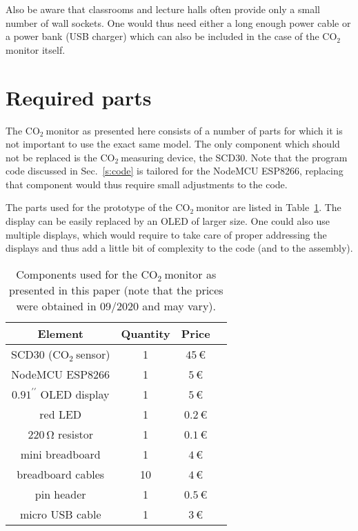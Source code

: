 \documentclass[12pt,a4paper]{article}
\newcommand{\inchsign}{^{\prime\prime}}
\newcommand{\coo}{\ensuremath{\mathrm{CO_2}~}}
\begin{document}
Also be aware that classrooms and lecture halls often provide only a small number of wall sockets. One would thus need either a long enough power cable or a power bank (USB charger) which can also be included in the case of the \coo monitor itself.


\section{Required parts}
The \coo monitor as presented here consists of a number of parts for which it is not important to use the exact same model. The only component which should not be replaced is the \coo measuring device, the SCD30. Note that the program code discussed in Sec.~\ref{s:code} is tailored for the NodeMCU ESP8266, replacing that component would thus require small adjustments to the code. 

The parts used for the prototype of the \coo monitor are listed in Table~\ref{t:parts}. The display can be easily replaced by an OLED of larger size. One could also use multiple displays, which would require to take care of proper addressing the displays and thus add a little bit of complexity to the code (and to the assembly). 
\begin{table}\label{t:parts}
\center
\begin{tabular}{cccc}\toprule
Element & Quantity & Price \\\hline
SCD30 (\coo sensor) & 1 & $45\,$\euro \\
NodeMCU ESP8266 & 1 & $5\,$\euro \\
$0.91\inchsign$ OLED display	& 1	& $5\,$\euro \\
red LED					& 1 	& $0.2\,$\euro \\
$220\,\mathrm{\Omega}$ resistor	& 1	& $0.1\,$\euro \\
mini breadboard		& 1 & $4\,$\euro \\
breadboard cables	& 10 & $4\,$\euro \\
pin header			& 1 & $0.5\,$\euro \\
micro USB cable		& 1 & $3\,$\euro \\
\bottomrule
\end{tabular}
\caption{Components used for the \coo monitor as presented in this paper (note that the prices were obtained in 09/2020 and may vary).}
\end{table}
\end{document}
